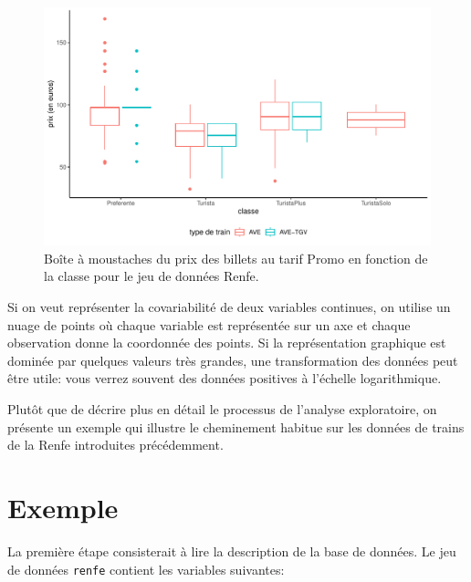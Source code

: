 \documentclass[
  11pt,
  letterpaper,
]{scrbook}
\theoremstyle{definition}
\theoremstyle{remark}
\begin{document}
\begin{figure}[ht!]

{\centering \includegraphics[width=1\textwidth,height=\textheight]{analyseexploratoire_files/figure-pdf/fig-histboxplot-1.pdf}

}

\caption{\label{fig-histboxplot}Boîte à moustaches du prix des billets
au tarif Promo en fonction de la classe pour le jeu de données Renfe.}

\end{figure}

Si on veut représenter la covariabilité de deux variables continues, on
utilise un nuage de points où chaque variable est représentée sur un axe
et chaque observation donne la coordonnée des points. Si la
représentation graphique est dominée par quelques valeurs très grandes,
une transformation des données peut être utile: vous verrez souvent des
données positives à l'échelle logarithmique.

Plutôt que de décrire plus en détail le processus de l'analyse
exploratoire, on présente un exemple qui illustre le cheminement habitue
sur les données de trains de la Renfe introduites précédemment.

\hypertarget{exemple}{%
\section{Exemple}\label{exemple}}

La première étape consisterait à lire la description de la base de
données. Le jeu de données \texttt{renfe} contient les variables
suivantes:
\end{document}
